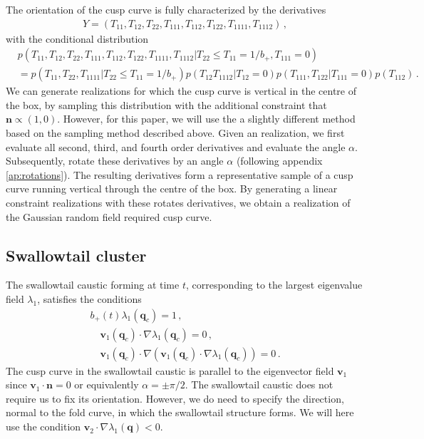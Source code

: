 \documentclass[a4paper, 11pt]{article}
\begin{document}
The orientation of the cusp curve is fully characterized by the derivatives  
\begin{align}
Y=(T_{11},T_{12},T_{22},T_{111},T_{112},T_{122},T_{1111},T_{1112})\,,
\end{align}
with the conditional distribution
\begin{align}
&p(T_{11},T_{12},T_{22},T_{111},T_{112},T_{122},T_{1111},T_{1112}|T_{22} \leq T_{11}=1/b_+, T_{111}=0)\\
&=
p(T_{11},T_{22},T_{1111}|T_{22}\leq T_{11}=1/b_+)p(T_{12}T_{1112}|T_{12}=0)p(T_{111},T_{122}|T_{111}=0)p(T_{112})\,.\nonumber
\end{align}
We can generate realizations for which the cusp curve is vertical in the centre of the box, by sampling this distribution with the additional constraint that $\bm{n} \propto (1,0)$. However, for this paper, we will use the a slightly different method based on the sampling method described above. Given an realization, we first evaluate all second, third, and fourth order derivatives and evaluate the angle $\alpha$. Subsequently, rotate these derivatives by an angle $\alpha$ (following appendix \ref{ap:rotations}). The resulting derivatives form a representative sample of a cusp curve running vertical through the centre of the box. By generating a linear constraint realizations with these rotates derivatives, we obtain a realization of the Gaussian random field required cusp curve.

\subsection{Swallowtail cluster}
The swallowtail caustic forming at time $t$, corresponding to the largest eigenvalue field $\lambda_1$, satisfies the conditions
\begin{align}
b_+(t) \lambda_1(\bm{q}_c) = 1\,,\\
\quad \bm{v}_1(\bm{q}_c) \cdot \nabla\lambda_1(\bm{q}_c) = 0\,,\\
 \quad\bm{v}_1(\bm{q}_c)\cdot \nabla( \bm{v}_1(\bm{q}_c) \cdot \nabla\lambda_1(\bm{q}_c)) = 0\,.
\end{align}
The cusp curve in the swallowtail caustic is parallel to the eigenvector field $\bm{v}_1$ since $\bm{v}_1 \cdot \bm{n}=0$ or equivalently $\alpha = \pm \pi/2$. The swallowtail caustic does not require us to fix its orientation. However, we do need to specify the direction, normal to the fold curve, in which the swallowtail structure forms. We will here use the condition $\bm{v}_2 \cdot \nabla \lambda_1(\bm{q}) <0$.
\end{document}
